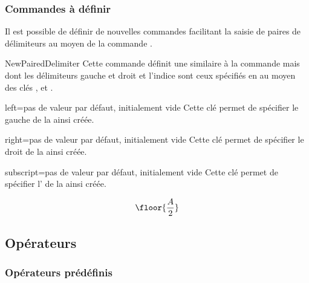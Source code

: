 \documentclass[french,nolocaltoc]{nwejmart}
\newtheorem[style=definition]{fait}
\newtheorem[title=contraventionnalisation]{ctrv}
\newtheorem[title-plural=anneaux]{anneau}
\newtheorem[title-plural=idéaux]{idéal}
\begin{document}
\subsubsection{Commandes à définir}

Il est possible de définir de nouvelles commandes facilitant la saisie de paires
de délimiteurs au moyen de la commande .
%
\begin{docCommand}{NewPairedDelimiter}{}
  Cette commande définit une  similaire à la commande
   mais dont les délimiteurs gauche et droit et l'indice
  sont ceux spécifiés en  au moyen des clés ,
   et .
  \begin{docKey}{left}{=}{pas de valeur par défaut,
      initialement vide}
    Cette clé permet de spécifier le  gauche de la  ainsi
    créée.
  \end{docKey}
  \begin{docKey}{right}{=}{pas de valeur par défaut,
      initialement vide}
    Cette clé permet de spécifier le  droit de la
     ainsi créée.
  \end{docKey}
  \begin{docKey}{subscript}{=}{pas de valeur par défaut,
      initialement vide}
    Cette clé permet de spécifier l' de la  ainsi
    créée.
  \end{docKey}
\end{docCommand}

\begin{preamblecode}[listing options={morekeywords={[2]left,right,subscript}}]
\end{preamblecode}
\begin{bodycode}
\begin{equation}
\floor{\frac{A}{2}}
\end{equation}
\end{bodycode}

\subsection{Opérateurs}

\subsubsection{Opérateurs prédéfinis}
\end{document}

